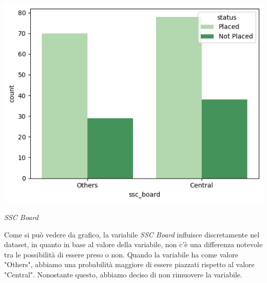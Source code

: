 \documentclass[12pt]{article}
\begin{document}
\begin{center}

    \includegraphics[scale=0.5]{sscboard.png}

    \textit{SSC Board}
\end{center}
Come si può vedere da grafico, la variabile \textit{SSC Board} influisce discretamente nel dataset, in quanto in base al valore della variabile, non c'è una differenza notevole tra le possibilità di essere preso o non. Quando la variabile ha come valore "Others", abbiamo una probabilità maggiore di essere piazzati rispetto al valore "Central".
Nonostante questo, abbiamo deciso di non rimuovere la variabile. 
\end{document}
